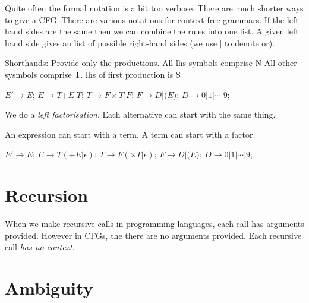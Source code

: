 \frmrule 

Quite often the formal notation is a bit too verbose. 
There are much shorter ways to give a CFG. 
There are various notations for context free grammars. 
If the left hand sides are the same then we can combine 
the rules into one list. A given left hand side 
gives an list of possible right-hand sides (we use $|$ to denote or). 

Shorthands:
Provide only the productions. All lhs symbols comprise N
All other sysmbols comprise T. lhs of first production is S






\begin{example}
$E' \rightarrow E$;
$E \rightarrow T \text{+} E | T$;
$T \rightarrow F \times T | F$;
$F \rightarrow D | \text{(} E \text{)}$;
$D \rightarrow \text{0} | \text{1} | \dotsm | \text{9}$;
\end{example}

We do a \textit{left factorisation}. 
Each alternative can start with the same thing. 

An expression can start with a term.
A term can start with a factor.


$E' \rightarrow E$;
$E \rightarrow T (\text{+} E | \epsilon)$;
$T \rightarrow F (\times T | \epsilon)$;
$F \rightarrow D | \text{(} E \text{)}$;
$D \rightarrow \text{0} | \text{1} | \dotsm | \text{9}$;




\section{Recursion}




When we make recursive calls in programming languages, 
each call has arguments provided. 
However in CFGs, the there are no arguments provided. 
Each recursive call \textit{has no context}. 







\section{Ambiguity}


